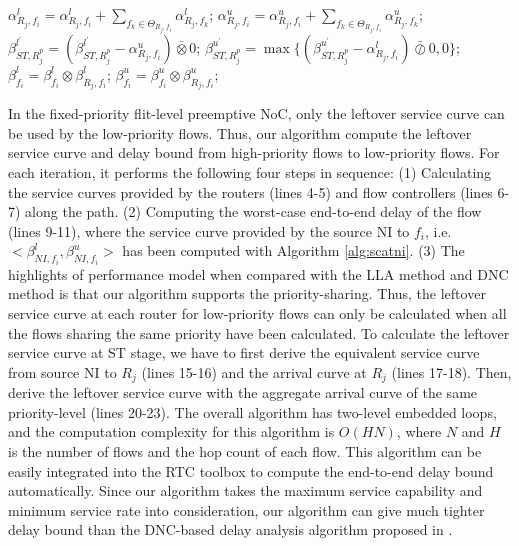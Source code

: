 \documentclass[preprint]{elsarticle}
\begin{document}
\begin{algorithm}
\begin{algorithmic}[1]
                    \State $\alpha^l_{R_j,f_i}=\alpha^l_{R_j,f_i}+\sum_{f_k\in\Theta_{R_j,f_i}}\alpha^l_{R_j,f_k}$;
                    \State $\alpha^u_{R_j,f_i}=\alpha^u_{R_j,f_i}+\sum_{f_k\in\Theta_{R_j,f_i}}\alpha^u_{R_j,f_k}$;
                    \State $\beta^{l^\prime}_{ST,R_j^{p}}=(\beta^{l^\prime}_{ST,R_j^{p}}-\alpha^u_{R_j,f_i})\bar{\otimes}0$;
                    \State $\beta^{u^\prime}_{ST,R_j^{p}}=\max\{(\beta^{u^\prime}_{ST,R_j^{p}}-\alpha^l_{R_j,f_i})\bar{\oslash}0,0\}$;
                \EndIf
            \EndIf
            \State $\beta_{f_i}^l=\beta_{f_i}^l\otimes\beta^l_{R_j,f_i}$;
            \State $\beta_{f_i}^u=\beta_{f_i}^u\otimes\beta^u_{R_j,f_i}$;
        \EndFor
    \EndFor
\end{algorithmic}
\end{algorithm}

In the fixed-priority flit-level preemptive NoC, only the leftover service curve can be used by the low-priority flows. Thus, our algorithm compute the leftover service curve and delay bound from high-priority flows to low-priority flows. For each iteration, it performs the following four steps in sequence: (1) Calculating the service curves provided by the routers (lines 4-5) and flow controllers (lines 6-7) along the path. (2) Computing the worst-case end-to-end delay of the flow (lines 9-11), where the service curve provided by the source NI to $f_i$, i.e. $<\beta_{NI,f_i}^l,\beta_{NI,f_i}^u>$ has been computed with Algorithm \ref{alg:scatni}. (3) The highlights of performance model when compared with the LLA method \cite{73} and DNC method \cite{Qian489900} is that our algorithm supports the priority-sharing. Thus, the leftover service curve at each router for low-priority flows can only be calculated when all the flows sharing the same priority have been calculated. To calculate the leftover service curve at ST stage, we have to first derive the equivalent service curve from source NI to $R_j$ (lines 15-16) and the arrival curve at $R_j$ (lines 17-18). Then, derive the leftover service curve with the aggregate arrival curve of the same priority-level (lines 20-23). The overall algorithm has two-level embedded loops, and the computation complexity for this algorithm is $O(HN)$, where $N$ and $H$ is the number of flows and the hop count of each flow. This algorithm can be easily integrated into the RTC toolbox \cite{rtc} to compute the end-to-end delay bound automatically. Since our algorithm takes the maximum service capability and minimum service rate into consideration, our algorithm can give much tighter delay bound than the DNC-based delay analysis algorithm proposed in \cite{Qian489900}.
\end{document}
